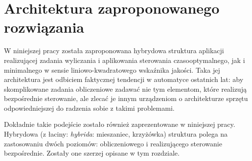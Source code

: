 \chapter{Architektura zaproponowanego rozwiązania}
\label{cha:arch}

W niniejszej pracy została zaproponowana hybrydowa struktura aplikacji realizującej zadania wyliczania i aplikowania sterowania czasooptymalnego, jak i minimalnego w sensie liniowo-kwadratowego wskaźnika jakości.
Taka jej architektura jest odbiciem faktycznej tendencji w automatyce ostatnich lat: aby skomplikowane zadania obliczeniowe zadawać nie tym elementom, które realizują bezpośrednie sterowanie, ale zlecać je innym urządzeniom o architekturze sprzętu odpowiedniejszej do radzenia sobie z takimi problemami.

Dokładnie takie podejście zostało również zaprezentowane w niniejszej pracy. Hybrydowa (z łaciny: \emph{hybrida}: mieszaniec, krzyżówka) struktura polega na zastosowaniu dwóch poziomów: obliczeniowego i realizującego sterowanie bezpośrednie. Zostały one szerzej opisane w tym rozdziale.




